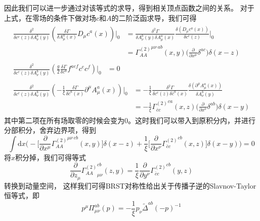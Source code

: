 因此我们可以进一步通过对该等式的求导，得到相关顶点函数之间的关系。
对于上式，在零场的条件下做对场$c$和$A$的二阶泛函求导，我们可得
\begin{align}
\begin{split}
    \frac{\delta^2}{\delta c^c(z)\delta A^b_\nu(y)}\left(  \frac{\delta \Gamma}{\delta A_\mu^a(x)}D_\mu c^a(x) \right)\Bigg|_0 &= \frac{\delta^2\Gamma}{\delta A^b_\nu(y)\delta A^a_\mu(x)} \frac{\delta(D_\mu c^a(x))}{\delta c^c(z)}\Bigg|_0 \\&={\Gamma^{(2)}_{AA}}^{\mu\nu~ab}(x,y) \Bigg( \frac{\partial}{\partial x^\mu} \delta^{ac}  \Bigg) \delta(x-z)
\end{split}\\
\begin{split}
    \frac{\delta^2}{\delta c^c(z)\delta A^b_\nu(y)}\left(   \frac{g}{2} \frac{\delta\Gamma}{\delta c^a}f^{aef}c^e c^f\right)\Bigg|_0 &= 0
\end{split}\\
\begin{split}
    \frac{\delta^2}{\delta c^c(z)\delta A^b_\nu(y)}\left(-\frac{1}{\xi}\frac{\delta\Gamma}{\delta \bar{c}^a(x)}\partial^\mu A_\mu^a(x)\right)\Bigg|_0 &= -\frac1\xi \frac{\delta^2\Gamma}{\delta c^c(z)\delta \bar{c}^a(x)}\frac{\delta(\partial^\mu A_\mu^a(x))}{\delta A_\nu^b(y)}\\&=-\frac1\xi {\Gamma^{(2)}_{\bar{c}c}}^{ca}(x,z)\Bigg(\frac{\partial}{\partial x^\nu}\delta^{ab}\Bigg) \delta(x-y)
\end{split}
\end{align}
其中第二项在所有场取零的时候会变为0。这时我们可以带入到原积分内，并进行分部积分，舍弃边界项，得到
\begin{equation}
    \int\mathrm{d}x\Bigg( -\Big[\frac{\partial}{\partial x^\mu}{\Gamma^{(2)}_{AA}}^{\mu\nu ~cb}(x,y)\Big]\delta(x-z) + \frac{1}{\xi}\Big[ \frac{\partial}{\partial x^\nu}{\Gamma^{(2)}_{\bar{c}c}}^{cb}(x,z) \Big]\delta(x-y) \Bigg) = 0
\end{equation}
将$x$积分掉，我们可得等式
\begin{equation}
    \frac{\partial}{\partial z_\mu}{\Gamma^{(2)}_{AA}}_{\mu\nu}^{cb}(z,y) = \frac{1}{\xi}\frac{\partial}{\partial y^\nu}{\Gamma^{(2)}_{\bar{c}c}}^{cb}(y,z)
\end{equation}
转换到动量空间，
这样我们可得BRST对称性给出关于传播子逆的Slavnov-Taylor恒等式，即
\begin{equation}
    p^\mu {\Pi_{\mu\nu}^{ab}}(p) = -\frac1\xi p_\nu{\widetilde{\Delta}^{ab}}(-p)^{-1}\label{eq:st_1}
\end{equation}

